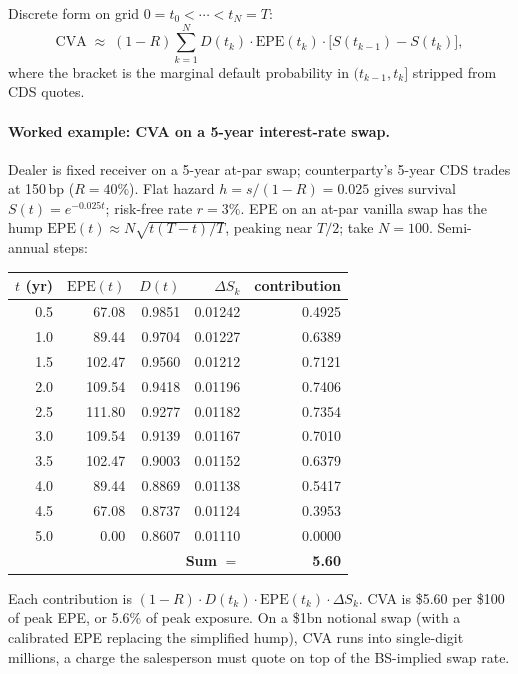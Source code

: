 Discrete form on grid $0 = t_0 < \cdots < t_N = T$:
\[
  \mathrm{CVA}
  \;\approx\; (1-R) \sum_{k=1}^{N}
  D(t_k) \cdot \mathrm{EPE}(t_k) \cdot
  \big[S(t_{k-1}) - S(t_k)\big],
\]
where the bracket is the marginal default probability in
$(t_{k-1}, t_k]$ stripped from CDS quotes.

\paragraph{Worked example: CVA on a 5-year interest-rate swap.}
Dealer is fixed receiver on a 5-year at-par swap; counterparty's
5-year CDS trades at 150\,bp ($R = 40\%$).  Flat hazard $h =
s/(1-R) = 0.025$ gives survival $S(t) = e^{-0.025 t}$; risk-free
rate $r = 3\%$.  EPE on an at-par vanilla swap has the hump
$\mathrm{EPE}(t) \approx N \sqrt{t(T-t)/T}$, peaking near $T/2$;
take $N = 100$.  Semi-annual steps:

\begin{center}
\small
\begin{tabular}{@{}rrrrr@{}}
\toprule
$t$ (yr) & $\mathrm{EPE}(t)$ & $D(t)$ & $\Delta S_k$ & contribution \\
\midrule
0.5 &  67.08 & 0.9851 & 0.01242 & 0.4925 \\
1.0 &  89.44 & 0.9704 & 0.01227 & 0.6389 \\
1.5 & 102.47 & 0.9560 & 0.01212 & 0.7121 \\
2.0 & 109.54 & 0.9418 & 0.01196 & 0.7406 \\
2.5 & 111.80 & 0.9277 & 0.01182 & 0.7354 \\
3.0 & 109.54 & 0.9139 & 0.01167 & 0.7010 \\
3.5 & 102.47 & 0.9003 & 0.01152 & 0.6379 \\
4.0 &  89.44 & 0.8869 & 0.01138 & 0.5417 \\
4.5 &  67.08 & 0.8737 & 0.01124 & 0.3953 \\
5.0 &   0.00 & 0.8607 & 0.01110 & 0.0000 \\
\midrule
\multicolumn{4}{r}{\textbf{Sum} $= $} & \textbf{5.60} \\
\bottomrule
\end{tabular}
\end{center}

Each contribution is $(1-R) \cdot D(t_k) \cdot \mathrm{EPE}(t_k)
\cdot \Delta S_k$.  CVA is \$5.60 per \$100 of peak EPE, or 5.6\%
of peak exposure.  On a \$1bn notional swap (with a calibrated EPE
replacing the simplified hump), CVA runs into single-digit
millions, a charge the salesperson must quote on top of the
BS-implied swap rate.

